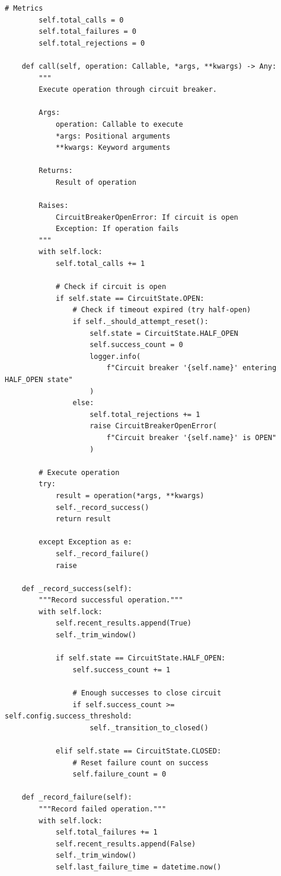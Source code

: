 \begin{lstlisting}[style=python, caption={Circuit Breaker Pattern}]
        # Metrics
        self.total_calls = 0
        self.total_failures = 0
        self.total_rejections = 0

    def call(self, operation: Callable, *args, **kwargs) -> Any:
        """
        Execute operation through circuit breaker.

        Args:
            operation: Callable to execute
            *args: Positional arguments
            **kwargs: Keyword arguments

        Returns:
            Result of operation

        Raises:
            CircuitBreakerOpenError: If circuit is open
            Exception: If operation fails
        """
        with self.lock:
            self.total_calls += 1

            # Check if circuit is open
            if self.state == CircuitState.OPEN:
                # Check if timeout expired (try half-open)
                if self._should_attempt_reset():
                    self.state = CircuitState.HALF_OPEN
                    self.success_count = 0
                    logger.info(
                        f"Circuit breaker '{self.name}' entering HALF_OPEN state"
                    )
                else:
                    self.total_rejections += 1
                    raise CircuitBreakerOpenError(
                        f"Circuit breaker '{self.name}' is OPEN"
                    )

        # Execute operation
        try:
            result = operation(*args, **kwargs)
            self._record_success()
            return result

        except Exception as e:
            self._record_failure()
            raise

    def _record_success(self):
        """Record successful operation."""
        with self.lock:
            self.recent_results.append(True)
            self._trim_window()

            if self.state == CircuitState.HALF_OPEN:
                self.success_count += 1

                # Enough successes to close circuit
                if self.success_count >= self.config.success_threshold:
                    self._transition_to_closed()

            elif self.state == CircuitState.CLOSED:
                # Reset failure count on success
                self.failure_count = 0

    def _record_failure(self):
        """Record failed operation."""
        with self.lock:
            self.total_failures += 1
            self.recent_results.append(False)
            self._trim_window()
            self.last_failure_time = datetime.now()


\end{lstlisting}
